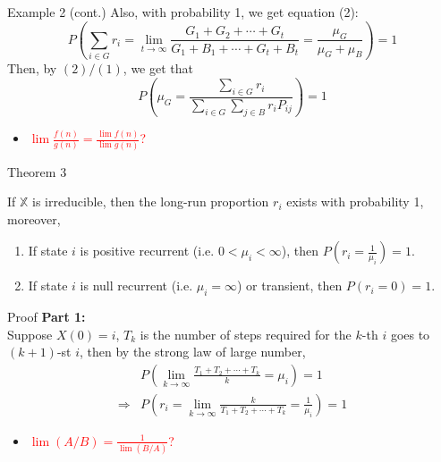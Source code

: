\documentclass[mathserif]{beamer}
\begin{document}
\begin{frame}{Example 2 (cont.)}
	Also, with probability 1, we get equation (2):
	\[
	P\left( \sum_{i \in G} r_i = 
	\lim_{t\to\infty}\frac{G_1 + G_2 + \cdots + G_t}{G_1 + B_1 + \cdots + G_t + B_t}
	= \frac{\mu_G}{\mu_G + \mu_B} \right) = 1
	\]
	Then, by $(2)/(1)$, we get that
	\[
	P\left( \mu_G = \frac{\sum_{i \in G} r_i}{\sum_{i \in G}\sum_{j \in B} r_i P_{ij}} \right) = 1
	\]
	\begin{itemize}
	\item \textcolor{red}{$\lim \frac{f(n)}{g(n)} = \frac{\lim f(n)}{\lim g(n)}$?}
	\end{itemize}
\end{frame}

\begin{frame}{Theorem 3}\label{pro_value}
	\begin{theorem}
	If $\mathbb{X}$ is irreducible, then the long-run proportion $r_i$ exists with probability 1, moreover,
	\begin{enumerate}
	\item If state $i$ is positive recurrent (i.e. $0 < \mu_i < \infty$), then $P(r_i = \frac{1}{\mu_i}) = 1$.
	\item If state $i$ is null recurrent (i.e. $\mu_i = \infty$) or transient, then $P(r_i = 0) = 1$.
	\end{enumerate}
	\end{theorem}
\end{frame}

\begin{frame}{Proof}
	\textbf{Part 1:} \\
	Suppose $X(0) = i$, $T_k$ is the number of steps required for the $k$-th $i$ goes to $(k+1)$-st $i$,
	then by the strong law of large number,
	\begin{align*}
	&P\left( \lim_{k\to\infty} \frac{T_1 + T_2 + \cdots + T_k}{k} = \mu_i \right) = 1 \\
	\Rightarrow & P\left( r_i = \lim_{k\to\infty} \frac{k}{T_1 + T_2 + \cdots + T_k} = \frac{1}{\mu_i} \right) = 1
	\end{align*}
	\begin{itemize}
	\item \textcolor{red}{$\lim (A/B) = \frac{1}{\lim (B/A)}$?}
	\end{itemize}
\end{frame}
\end{document}
